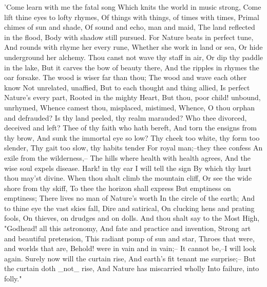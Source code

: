   'Come learn with me the fatal song
Which knits the world in music strong,
Come lift thine eyes to lofty rhymes,
Of things with things, of times with times,
Primal chimes of sun and shade,
Of sound and echo, man and maid,
The land reflected in the flood,
Body with shadow still pursued.
For Nature beats in perfect tune,
And rounds with rhyme her every rune,
Whether she work in land or sea,
Or hide underground her alchemy.
Thou canst not wave thy staff in air,
Or dip thy paddle in the lake,
But it carves the bow of beauty there,
And the ripples in rhymes the oar forsake.
The wood is wiser far than thou;
The wood and wave each other know
Not unrelated, unaffied,
But to each thought and thing allied,
Is perfect Nature's every part,
Rooted in the mighty Heart,
But thou, poor child! unbound, unrhymed,
Whence camest thou, misplaced, mistimed,
Whence, O thou orphan and defrauded?
Is thy land peeled, thy realm marauded?
Who thee divorced, deceived and left?
Thee of thy faith who hath bereft,
And torn the ensigns from thy brow,
And sunk the immortal eye so low?
Thy cheek too white, thy form too slender,
Thy gait too slow, thy habits tender
For royal man;--they thee confess
An exile from the wilderness,--
The hills where health with health agrees,
And the wise soul expels disease.
Hark! in thy ear I will tell the sign
By which thy hurt thou may'st divine.
When thou shalt climb the mountain cliff,
Or see the wide shore from thy skiff,
To thee the horizon shall express
But emptiness on emptiness;
There lives no man of Nature's worth
In the circle of the earth;
And to thine eye the vast skies fall,
Dire and satirical,
On clucking hens and prating fools,
On thieves, on drudges and on dolls.
And thou shalt say to the Most High,
"Godhead! all this astronomy,
And fate and practice and invention,
Strong art and beautiful pretension,
This radiant pomp of sun and star,
Throes that were, and worlds that are,
Behold! were in vain and in vain;--
It cannot be,--I will look again.
Surely now will the curtain rise,
And earth's fit tenant me surprise;--
But the curtain doth _not_ rise,
And Nature has miscarried wholly
Into failure, into folly."

